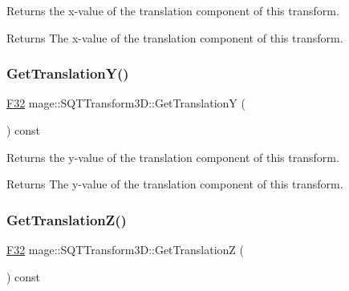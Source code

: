 Returns the x-\/value of the translation component of this transform.

\begin{DoxyReturn}{Returns}
The x-\/value of the translation component of this transform. 
\end{DoxyReturn}
\mbox{\label{classmage_1_1_s_q_t_transform3_d_adbdcd99be81071e1c34e96d8822b2e8d}} 
\subsubsection{\texorpdfstring{Get\+Translation\+Y()}{GetTranslationY()}}
{\footnotesize\ttfamily \mbox{\hyperlink{namespacemage_aa97e833b45f06d60a0a9c4fc22ae02c0}{F32}} mage\+::\+S\+Q\+T\+Transform3\+D\+::\+Get\+TranslationY (\begin{DoxyParamCaption}{ }\end{DoxyParamCaption}) const\hspace{0.3cm}{\ttfamily [noexcept]}}

Returns the y-\/value of the translation component of this transform.

\begin{DoxyReturn}{Returns}
The y-\/value of the translation component of this transform. 
\end{DoxyReturn}
\mbox{\label{classmage_1_1_s_q_t_transform3_d_a17a5f4f0c51e4aafaf18a94222bce615}} 
\subsubsection{\texorpdfstring{Get\+Translation\+Z()}{GetTranslationZ()}}
{\footnotesize\ttfamily \mbox{\hyperlink{namespacemage_aa97e833b45f06d60a0a9c4fc22ae02c0}{F32}} mage\+::\+S\+Q\+T\+Transform3\+D\+::\+Get\+TranslationZ (\begin{DoxyParamCaption}{ }\end{DoxyParamCaption}) const\hspace{0.3cm}{\ttfamily [noexcept]}}

